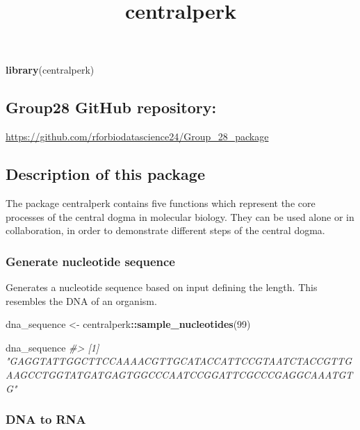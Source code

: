 \documentclass[
]{article}
\title{centralperk}
\author{}
\date{\vspace{-2.5em}}
\newenvironment{Shaded}{\begin{snugshade}}{\end{snugshade}}
\newcommand{\CommentTok}[1]{\textcolor[rgb]{0.56,0.35,0.01}{\textit{#1}}}
\newcommand{\DecValTok}[1]{\textcolor[rgb]{0.00,0.00,0.81}{#1}}
\newcommand{\FunctionTok}[1]{\textcolor[rgb]{0.13,0.29,0.53}{\textbf{#1}}}
\newcommand{\NormalTok}[1]{#1}
\newcommand{\OtherTok}[1]{\textcolor[rgb]{0.56,0.35,0.01}{#1}}
\newcommand{\SpecialCharTok}[1]{\textcolor[rgb]{0.81,0.36,0.00}{\textbf{#1}}}
\begin{document}
\maketitle

\begin{Shaded}
\begin{Highlighting}[]
\FunctionTok{library}\NormalTok{(centralperk)}
\end{Highlighting}
\end{Shaded}

\subsection{Group28 GitHub repository:}\label{group28-github-repository}

\url{https://github.com/rforbiodatascience24/Group_28_package}

\subsection{Description of this
package}\label{description-of-this-package}

The package centralperk contains five functions which represent the core
processes of the central dogma in molecular biology. They can be used
alone or in collaboration, in order to demonstrate different steps of
the central dogma.

\subsubsection{Generate nucleotide
sequence}\label{generate-nucleotide-sequence}

Generates a nucleotide sequence based on input defining the length. This
resembles the DNA of an organism.

\begin{Shaded}
\begin{Highlighting}[]
\NormalTok{dna\_sequence }\OtherTok{\textless{}{-}}\NormalTok{ centralperk}\SpecialCharTok{::}\FunctionTok{sample\_nucleotides}\NormalTok{(}\DecValTok{99}\NormalTok{)}

\NormalTok{dna\_sequence}
\CommentTok{\#\textgreater{} [1] "GAGGTATTGGCTTCCAAAACGTTGCATACCATTCCGTAATCTACCGTTGAAGCCTGGTATGATGAGTGGCCCAATCCGGATTCGCCCGAGGCAAATGTG"}
\end{Highlighting}
\end{Shaded}

\subsubsection{DNA to RNA}\label{dna-to-rna}
\end{document}

